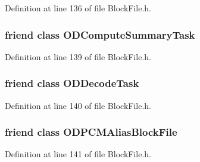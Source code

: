 Definition at line 136 of file Block\+File.\+h.

\subsubsection[{\texorpdfstring{O\+D\+Compute\+Summary\+Task}{ODComputeSummaryTask}}]{\setlength{\rightskip}{0pt plus 5cm}friend class {\bf O\+D\+Compute\+Summary\+Task}\hspace{0.3cm}{\ttfamily [friend]}}\hypertarget{class_block_file_a24c4db9b12ac4619d1b2a0966f0e756c}{}\label{class_block_file_a24c4db9b12ac4619d1b2a0966f0e756c}


Definition at line 139 of file Block\+File.\+h.

\subsubsection[{\texorpdfstring{O\+D\+Decode\+Task}{ODDecodeTask}}]{\setlength{\rightskip}{0pt plus 5cm}friend class {\bf O\+D\+Decode\+Task}\hspace{0.3cm}{\ttfamily [friend]}}\hypertarget{class_block_file_aee4dd21db513d608a0b91918d594fbbe}{}\label{class_block_file_aee4dd21db513d608a0b91918d594fbbe}


Definition at line 140 of file Block\+File.\+h.

\subsubsection[{\texorpdfstring{O\+D\+P\+C\+M\+Alias\+Block\+File}{ODPCMAliasBlockFile}}]{\setlength{\rightskip}{0pt plus 5cm}friend class {\bf O\+D\+P\+C\+M\+Alias\+Block\+File}\hspace{0.3cm}{\ttfamily [friend]}}\hypertarget{class_block_file_a1927ec7b2f6462da76274870b38d98c3}{}\label{class_block_file_a1927ec7b2f6462da76274870b38d98c3}


Definition at line 141 of file Block\+File.\+h.



